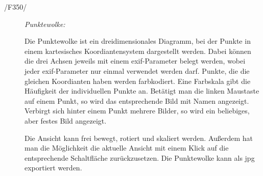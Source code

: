 \begin{description}
		\item[/F350/] \textit{Punktewolke:}\par		
			\begin{figure}[H]
				\centering
			\end{figure}
			Die Punktewolke ist ein dreidimensionales Diagramm, bei der Punkte in einem kartesisches Koordiantensystem dargestellt werden.
			Dabei können die drei Achsen jeweils mit einem \gls{exif}-Parameter belegt werden, wobei jeder \gls{exif}-Parameter nur einmal verwendet werden darf.
			Punkte, die die gleichen Koordianten haben werden farbkodiert. Eine Farbskala gibt die Häufigkeit der individuellen Punkte an.
			Betätigt man die linken Maustaste auf einem Punkt, so wird das entsprechende Bild mit Namen angezeigt. Verbirgt sich hinter einem Punkt mehrere Bilder, so wird ein beliebiges, aber festes Bild angezeigt. 
			\par 
			
		Die Ansicht kann frei bewegt, rotiert und skaliert werden. Außerdem hat man die Möglichkeit die aktuelle Ansicht mit einem Klick auf die entsprechende Schaltfläche zurückzusetzen.
			Die Punktewolke kann als \gls{jpg} exportiert werden.

	\end{description}

